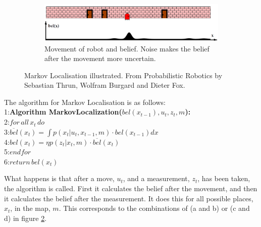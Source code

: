 \begin{figure}[H]
\begin{subfigure}[b]{.8\textwidth}
  \centering
  \includegraphics[width=1\linewidth]{billeder/MarkovLocalisation05.png}
  \caption{Movement of robot and belief. Noise makes the belief after the movement more uncertain.}
  \label{ML_fig1:sub5}
\end{subfigure}

\caption{Markov Localisation illustrated. From Probabilistic Robotics by Sebastian Thrun, Wolfram Burgard and Dieter Fox.}
\label{ML_fig1}
\end{figure}

The algorithm for Markov Localisation is as follows:\\
1:\quad \textbf{Algorithm MarkovLocalization(}$bel(x_{t-1}),u_t,z_t,m$\textbf{):}\\
2:\quad \quad $for\,all\,x_t\,do$\\
3:\quad \qquad $\overline{bel}(x_t) = \int p(x_t|u_t,x_{t-1},m)\cdot bel(x_{t-1}) dx$\\
4:\quad \qquad $bel(x_t) = \eta p(z_t|x_t,m)\cdot \overline{bel}(x_t)$\\
5:\quad \quad $endfor$\\
6:\quad \quad $return\,bel(x_t)$

What happens is that after a move, $u_t$, and a measurement, $z_t$, has been taken, the algorithm is called. First it calculates the belief after the movement, and then it calculates the belief after the measurement. It does this for all possible places, $x_t$, in the map, $m$. This corresponds to the combinations of (a and b) or (c and d) in figure \ref{ML_fig1}.